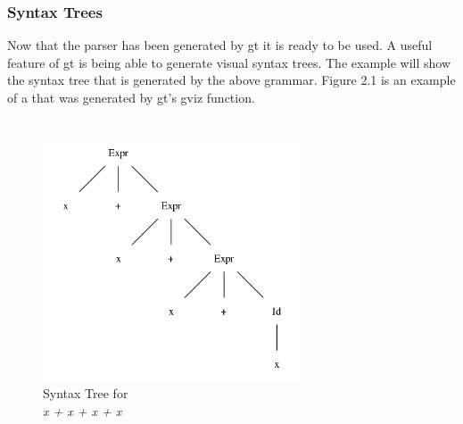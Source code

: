 \subsubsection{Syntax Trees}

Now that the parser has been generated by gt it is ready to be used. A useful feature
of gt is being able to generate visual syntax trees. The example will show the 
syntax tree that is generated by the above grammar. Figure 2.1 is an example of a 
that was generated by gt's gviz function. \\ \\

\begin{figure}[h!]
  \centering
  \includegraphics[width=3in]{./examples/bnf/simple/simple.png}
  \caption{Syntax Tree for\\ \textit{x + x + x + x}}
\end{figure}




